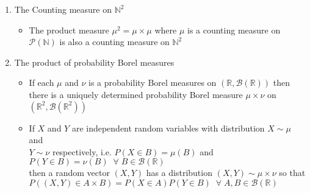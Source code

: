 \documentclass[12pt]{article}
\newcommand{\N}{\mathbb{N}}
\newcommand{\R}{\mathbb{R}}
\newcommand{\B}{\mathcal{B}}
\newcommand{\Borel}{\mathcal{B}(\mathbb{R})}
\newcommand{\forany}{\; \forall \;}
\begin{document}
\begin{itemize}
\begin{enumerate}
\begin{itemize}
        \end{itemize}
        \item The Counting measure on $\N^2$
        \begin{itemize}
            \item The product measure $\mu^2=\mu\times \mu$ where $\mu$ is a counting measure on $\mathcal{P}(\N)$ is also a counting measure on $\N^2$
        \end{itemize}
        \item The product of probability Borel measures
        \begin{itemize}
            \item If each $\mu$ and $\nu$ is a probability Borel measures on $(\R, \Borel)$ then there is a uniquely determined probability Borel measure $\mu\times \nu$ on $(\R^2, \B(\R^2))$
            \item If $X$ and $Y$ are independent random variables with distribution $X\sim \mu$ and \\$Y\sim \nu$ respectively, \; i.e. $P(X\in B)=\mu(B)$ and $P(Y\in B)=\nu(B)\;\forany B\in \Borel$ \\ then a random vector $(X,Y)$ has a distribution $(X,Y)\sim \mu\times \nu$ so that \\
            $P((X,Y)\in A\times B)=P(X\in A)P(Y\in B)\;\forany A,B\in \Borel$
        \end{itemize} 
    \end{enumerate}
\end{itemize}
\smallskip
\end{document}
